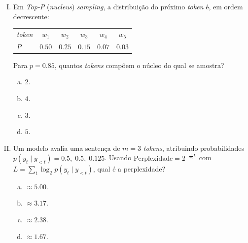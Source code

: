 \documentclass{dlproblemset}
\begin{document}
\begin{enumerate}[I)]
\begin{enumerate}[a)]
    \item $\approx 0.881$.
    \item $\approx 0.731$.
    \item $\approx 0.622$.
    \item $\approx 0.500$.
\end{enumerate}

\item Em \textit{Top-P} (\textit{nucleus}) \textit{sampling}, a distribuição do próximo
\textit{token} é, em ordem decrescente:

\begin{center}
\begin{tabular}{lccccc}
    \toprule
    \textit{token}    & $w_1$   & $w_2$    & $w_3$    & $w_4$    & $w_5$ \\
    $P$               & $0.50$ & $0.25$ & $0.15$ & $0.07$ & $0.03$ \\
    \bottomrule
\end{tabular}
\end{center}

Para $p = 0.85$, quantos \textit{tokens} compõem o núcleo do qual se amostra?

\begin{enumerate}[a)]
    \item $2$.
    \item $4$.
    \item $3$.
    \item $5$.
\end{enumerate}

\item Um modelo avalia uma sentença de $m = 3$ \textit{tokens}, atribuindo probabilidades
$p(y_t \mid y_{<t}) = 0.5,\; 0.5,\; 0.125$. Usando
$\text{Perplexidade} = 2^{-\frac{1}{m} L}$ com $L = \sum_{t} \log_2 p(y_t \mid y_{<t})$, qual é a
perplexidade?

\begin{enumerate}[a)]
    \item $\approx 5.00$.
    \item $\approx 3.17$.
    \item $\approx 2.38$.
    \item $\approx 1.67$.
\end{enumerate}


\end{enumerate}
\end{document}

